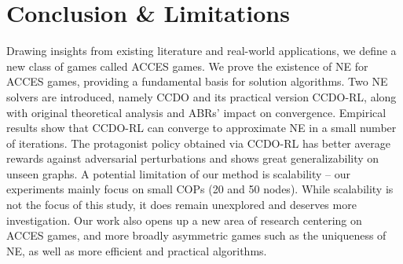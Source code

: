 \section{Conclusion \& Limitations}
Drawing insights from existing literature and real-world applications, we define a new class of games called ACCES games. We prove the existence of NE for ACCES games, providing a fundamental basis for solution algorithms. Two NE solvers are introduced, namely CCDO and its practical version CCDO-RL, along with original theoretical analysis and ABRs' impact on convergence.
Empirical results show that CCDO-RL can converge to approximate NE in a small number of iterations. The protagonist policy obtained via CCDO-RL has better average rewards against adversarial perturbations and shows great generalizability on unseen graphs. A potential limitation of our method is scalability -- our experiments mainly focus on small COPs (20 and 50 nodes). While scalability is not the focus of this study, it does remain unexplored and deserves more investigation. Our work also opens up a new area of research centering on ACCES games, and more broadly asymmetric games such as the uniqueness of NE, as well as more efficient and practical algorithms.
\newpage